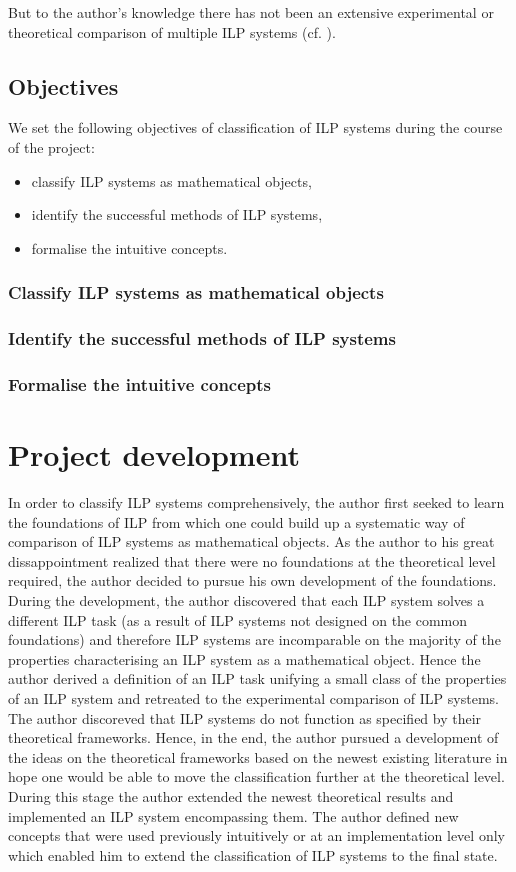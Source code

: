 But to the author's knowledge there has not been an extensive experimental or theoretical comparison of multiple ILP systems (cf. ). 

\subsection{Objectives}
We set the following objectives of classification of ILP systems during the course of the project:
\begin{itemize}
\item classify ILP systems as mathematical objects,
\item identify the successful methods of ILP systems,
\item formalise the intuitive concepts.
\end{itemize}

\subsubsection{Classify ILP systems as mathematical objects}


\subsubsection{Identify the successful methods of ILP systems}

\subsubsection{Formalise the intuitive concepts}

\section{Project development}
In order to classify ILP systems comprehensively, the author first seeked to learn the foundations of ILP from which one could build up a systematic way of comparison of ILP systems as mathematical objects. As the author to his great dissappointment realized that there were no foundations at the theoretical level required, the author decided to pursue his own development of the foundations. During the development, the author discovered that each ILP system solves a different ILP task (as a result of ILP systems not designed on the common foundations) and therefore ILP systems are incomparable on the majority of the properties characterising an ILP system as a mathematical object. Hence the author derived a definition of an ILP task unifying a small class of the properties of an ILP system and retreated to the experimental comparison of ILP systems. The author discoreved that ILP systems do not function as specified by their theoretical frameworks. Hence, in the end, the author pursued a development of the ideas on the theoretical frameworks based on the newest existing literature in hope one would be able to move the classification further at the theoretical level. During this stage the author extended the newest theoretical results and implemented an ILP system encompassing them. The author defined new concepts that were used previously intuitively or at an implementation level only which enabled him to extend the classification of ILP systems to the final state.

